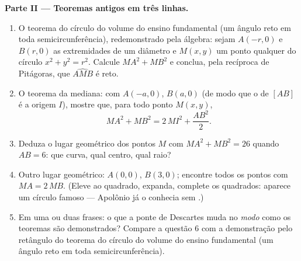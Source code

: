 \begin{problem}
\medskip
\noindent\textbf{Parte II --- Teoremas antigos em três linhas.}
\begin{enumerate}[resume]
  \item O teorema do círculo do volume do ensino fundamental (um
        ângulo reto em toda semicircunferência), redemonstrado
        pela álgebra: sejam $A(-r, 0)$ e $B(r, 0)$ as
        extremidades de um diâmetro e $M(x, y)$ um ponto qualquer
        do círculo $x^2 + y^2 = r^2$. Calcule $MA^2 + MB^2$ e
        conclua, pela recíproca de Pitágoras, que
        $\widehat{AMB}$ é reto.
  \item O teorema da mediana: com $A(-a, 0)$, $B(a, 0)$ (de modo
        que o  de $[AB]$ é a origem $I$), mostre que,
        para todo ponto $M(x, y)$,
        \[
        MA^2 + MB^2 = 2\,MI^2 + \frac{AB^2}{2} .
        \]
  \item Deduza o lugar geométrico dos pontos $M$ com
        $MA^2 + MB^2 = 26$ quando $AB = 6$: que curva, qual
        centro, qual raio?
  \item Outro lugar geométrico: $A(0,0)$, $B(3,0)$; encontre
        todos os pontos com $MA = 2\,MB$. (Eleve ao quadrado,
        expanda, complete os quadrados: aparece um círculo
        famoso --- Apolônio já o conhecia sem .)
  \item Em uma ou duas frases: o que a ponte de Descartes muda no
        \emph{modo} como os teoremas são demonstrados? Compare a
        questão 6 com a demonstração pelo retângulo do teorema do
        círculo do volume do ensino fundamental (um ângulo reto
        em toda semicircunferência).
\end{enumerate}


\end{problem}
